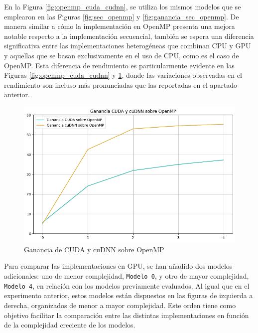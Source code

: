En la Figura \ref{fig:openmp_cuda_cudnn}, se utiliza los mismos modelos que se emplearon en las Figuras \ref{fig:sec_openmp} y \ref{fig:ganancia_sec_openmp}.
De manera similar a cómo la implementación en OpenMP presenta una mejora notable respecto a la implementación secuencial, también se espera una diferencia significativa entre las implementaciones heterogéneas que combinan CPU y GPU  y aquellas que se basan exclusivamente en el uso de CPU, como es el caso de OpenMP. Esta diferencia de rendimiento es particularmente evidente en las Figuras \ref{fig:openmp_cuda_cudnn} y \ref{fig:ganancia_cuda_cudnn_openmp}, donde las variaciones observadas en el rendimiento son incluso más pronunciadas que las reportadas en el apartado anterior.

\begin{figure}[H]
	\centering
	\includegraphics[scale=0.5]{imagenes/ganancia_cuda_cudnn_openmp.png}  
	\caption{Ganancia de CUDA y cuDNN sobre OpenMP}
	\label{fig:ganancia_cuda_cudnn_openmp}
\end{figure}

Para comparar las implementaciones en GPU, se han añadido dos modelos adicionales: uno de menor complejidad, \texttt{Modelo 0}, y otro de mayor complejidad, \texttt{Modelo 4}, en relación con los modelos previamente evaluados. Al igual que en el experimento anterior, estos modelos están dispuestos en las figuras de izquierda a derecha, organizados de menor a mayor complejidad. Este orden tiene como objetivo facilitar la comparación entre las distintas implementaciones en función de la complejidad creciente de los modelos.

